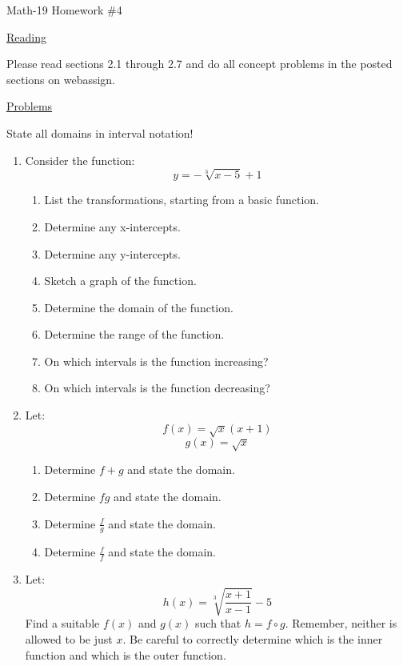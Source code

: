 \documentclass[letterpaper,12pt,fleqn]{article}
\begin{document}
\begin{center}
\Large Math-19 Homework \#4
\end{center}

\vspace{0.5in}

\underline{Reading}

Please read sections 2.1 through 2.7 and do all concept problems in the posted
sections on web\-assign.

\underline{Problems}

State all domains in interval notation!

\begin{enumerate}
\item Consider the function:
\[y=-\sqrt[3]{x-5}+1\]
\begin{enumerate}
\item List the transformations, starting from a basic function.
\item Determine any x-intercepts.
\item Determine any y-intercepts.
\item Sketch a graph of the function.
\item Determine the domain of the function.
\item Determine the range of the function.
\item On which intervals is the function increasing?
\item On which intervals is the function decreasing?
\end{enumerate}

\bigskip

\item Let:
\[f(x)=\sqrt{x}(x+1)\]
\[g(x)=\sqrt{x}\]
\begin{enumerate}
\item Determine $f+g$ and state the domain.
\item Determine $fg$ and state the domain.
\item Determine $\frac{f}{g}$ and state the domain.
\item Determine $\frac{f}{f}$ and state the domain.
\end{enumerate}

\bigskip

\item Let:
\[h(x)=\sqrt[3]{\frac{x+1}{x-1}}-5\]
Find a suitable $f(x)$ and $g(x)$ such that $h=f\circ g$. Remember, neither is
allowed to be just $x$. Be careful to correctly determine which is the inner
function and which is the outer function.


\end{enumerate}
\end{document}

